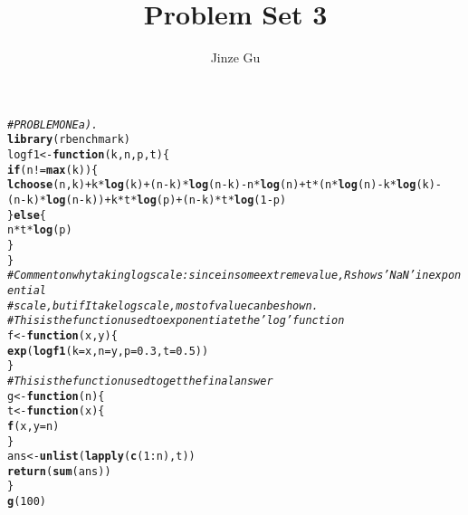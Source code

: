 \documentclass{article}\usepackage[]{graphicx}\usepackage[]{color}
\makeatletter
\newcommand{\hlnum}[1]{\textcolor[rgb]{0.686,0.059,0.569}{#1}}%
\newcommand{\hlcom}[1]{\textcolor[rgb]{0.678,0.584,0.686}{\textit{#1}}}%
\newcommand{\hlopt}[1]{\textcolor[rgb]{0,0,0}{#1}}%
\newcommand{\hlstd}[1]{\textcolor[rgb]{0.345,0.345,0.345}{#1}}%
\newcommand{\hlkwa}[1]{\textcolor[rgb]{0.161,0.373,0.58}{\textbf{#1}}}%
\newcommand{\hlkwb}[1]{\textcolor[rgb]{0.69,0.353,0.396}{#1}}%
\newcommand{\hlkwc}[1]{\textcolor[rgb]{0.333,0.667,0.333}{#1}}%
\newcommand{\hlkwd}[1]{\textcolor[rgb]{0.737,0.353,0.396}{\textbf{#1}}}%
\newenvironment{kframe}{%
 \def\at@end@of@kframe{}%
 \ifinner\ifhmode%
  \def\at@end@of@kframe{\end{minipage}}%
  \begin{minipage}{\columnwidth}%
 \fi\fi%
 \def\FrameCommand##1{\hskip\@totalleftmargin \hskip-\fboxsep
 \colorbox{shadecolor}{##1}\hskip-\fboxsep
     \hskip-\linewidth \hskip-\@totalleftmargin \hskip\columnwidth}%
 \MakeFramed {\advance\hsize-\width
   \@totalleftmargin\z@ \linewidth\hsize
   \@setminipage}}%
 {\par\unskip\endMakeFramed%
 \at@end@of@kframe}
\newenvironment{knitrout}{}{} %
\makeatother
\begin{document}
\title{Problem Set 3}


\author{Jinze Gu}

\maketitle
\begin{knitrout}
\color{fgcolor}\begin{kframe}
\begin{alltt}
\hlcom{# PROBLEM ONE a).}
\hlkwd{library}\hlstd{(rbenchmark)}
\hlstd{logf1} \hlkwb{<-} \hlkwa{function}\hlstd{(}\hlkwc{k}\hlstd{,} \hlkwc{n}\hlstd{,} \hlkwc{p}\hlstd{,} \hlkwc{t}\hlstd{) \{}
    \hlkwa{if} \hlstd{(n} \hlopt{!=} \hlkwd{max}\hlstd{(k)) \{}
        \hlkwd{lchoose}\hlstd{(n, k)} \hlopt{+} \hlstd{k} \hlopt{*} \hlkwd{log}\hlstd{(k)} \hlopt{+} \hlstd{(n} \hlopt{-} \hlstd{k)} \hlopt{*} \hlkwd{log}\hlstd{(n} \hlopt{-} \hlstd{k)} \hlopt{-} \hlstd{n} \hlopt{*} \hlkwd{log}\hlstd{(n)} \hlopt{+} \hlstd{t} \hlopt{*} \hlstd{(n} \hlopt{*} \hlkwd{log}\hlstd{(n)} \hlopt{-} \hlstd{k} \hlopt{*} \hlkwd{log}\hlstd{(k)} \hlopt{-}
            \hlstd{(n} \hlopt{-} \hlstd{k)} \hlopt{*} \hlkwd{log}\hlstd{(n} \hlopt{-} \hlstd{k))} \hlopt{+} \hlstd{k} \hlopt{*} \hlstd{t} \hlopt{*} \hlkwd{log}\hlstd{(p)} \hlopt{+} \hlstd{(n} \hlopt{-} \hlstd{k)} \hlopt{*} \hlstd{t} \hlopt{*} \hlkwd{log}\hlstd{(}\hlnum{1} \hlopt{-} \hlstd{p)}
    \hlstd{\}} \hlkwa{else} \hlstd{\{}
        \hlstd{n} \hlopt{*} \hlstd{t} \hlopt{*} \hlkwd{log}\hlstd{(p)}
    \hlstd{\}}
\hlstd{\}}
\hlcom{# Comment on why taking log scale: since in some extreme value, R shows 'NaN'in exponential}
\hlcom{# scale,but if I take log scale, most of value can be shown.}
\hlcom{# This is the function used to exponentiate the 'log' function}
\hlstd{f} \hlkwb{<-} \hlkwa{function}\hlstd{(}\hlkwc{x}\hlstd{,} \hlkwc{y}\hlstd{) \{}
    \hlkwd{exp}\hlstd{(}\hlkwd{logf1}\hlstd{(}\hlkwc{k} \hlstd{= x,} \hlkwc{n} \hlstd{= y,} \hlkwc{p} \hlstd{=} \hlnum{0.3}\hlstd{,} \hlkwc{t} \hlstd{=} \hlnum{0.5}\hlstd{))}
\hlstd{\}}
\hlcom{# This is the function used to get the final answer}
\hlstd{g} \hlkwb{<-} \hlkwa{function}\hlstd{(}\hlkwc{n}\hlstd{) \{}
    \hlstd{t} \hlkwb{<-} \hlkwa{function}\hlstd{(}\hlkwc{x}\hlstd{) \{}
        \hlkwd{f}\hlstd{(x,} \hlkwc{y} \hlstd{= n)}
    \hlstd{\}}
    \hlstd{ans} \hlkwb{<-} \hlkwd{unlist}\hlstd{(}\hlkwd{lapply}\hlstd{(}\hlkwd{c}\hlstd{(}\hlnum{1}\hlopt{:}\hlstd{n), t))}
    \hlkwd{return}\hlstd{(}\hlkwd{sum}\hlstd{(ans))}
\hlstd{\}}
\hlkwd{g}\hlstd{(}\hlnum{100}\hlstd{)}
\end{alltt}

\end{kframe}
\end{knitrout}
\end{document}
